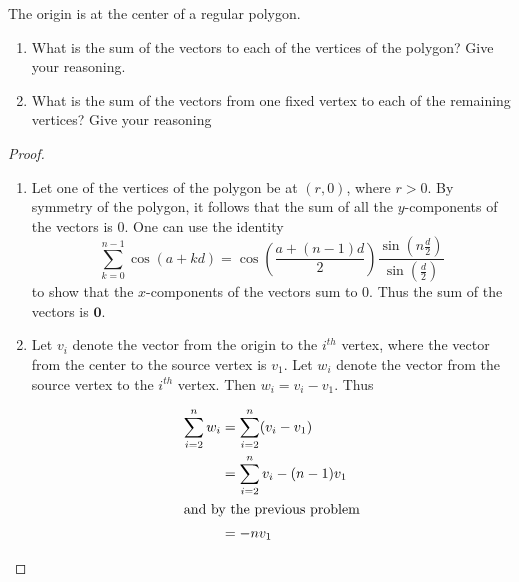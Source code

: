 \begin{exercise} \label{e1.1.3}
    The origin is at the center of a regular polygon.
    \begin{enumerate}
        \item What is the sum of the vectors to each of the vertices of the polygon? Give your reasoning.
        \item What is the sum of the vectors from one fixed vertex to each of the remaining vertices? Give your reasoning
    \end{enumerate}
    
    \begin{proof}
        \begin{enumerate}
            \item Let one of the vertices of the polygon be at \( (r,0) \), where \(r>0\). By symmetry of the polygon, it follows that the sum of all the \(y\)-components of the vectors is \( 0 \). One can use the identity
            \[
            \sum_{k=0}^{n-1} \cos(a+kd) = \cos\left( \frac{a+(n-1)d}{2} \right)\frac{ \sin\left( n \frac{d}{2} \right) }{\sin\left( \frac{d}{2} \right)}
            \]
            to show that the \(x\)-components of the vectors sum to \( 0 \). Thus the sum of the vectors is \( \mathbf{0} \).
            
            \item Let \( v_i \) denote the vector from the origin to the \( i^{th} \) vertex, where the vector from the center to the source vertex is \( v_1 \). Let \( w_i \) denote the vector from the source vertex to the \( i^{th} \) vertex. Then \( w_i = v_i - v_1 \). Thus
            
            \begin{align*}
                \sum_{i=2}^n w_i &= \sum_{i=2}^n (v_i - v_1) \\
                &= \sum_{i=2}^n v_i - (n-1)v_1 \\
                \intertext{and by the previous problem}
                &= -nv_1
            \end{align*}
        \end{enumerate}
    \end{proof}
\end{exercise}

